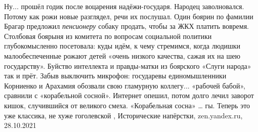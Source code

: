 Ну... прошёл годик после воцарения надёжи-государя. Народец заволновался.
Потому как рожи новые разглядел, речи их послушал. Один боярин по фамилии
Брагар предложил \emph{пенсионеру} собаку продать, чтобы за ЖКХ платить
вовремя. Столбовая боярыня из комитета по вопросам социальной политики
глубокомысленно посетовала: куды идём, к чему стремимся, когда людишки
малообеспеченные рожают детей «очень низкого качества, сажая их на шею
государству».  Буйство интеллекта и правды-матки из боярского «Слуги народа»
так и прёт. Забыв выключить микрофон: государевы единомышленники Корниенко и
Арахамия обозвали свою гламурную коллегу... «рабочей бабой», сравнили с
«корабельной сосной».  Интернет опешил, потом долго лечил заворот кишок,
случившийся от великого смеха. «Корабельная сосна» … гы. Теперь это уже
классика, не хуже гоголевской
, 
Исторические напёрстки, zen.yandex.ru, 28.10.2021
